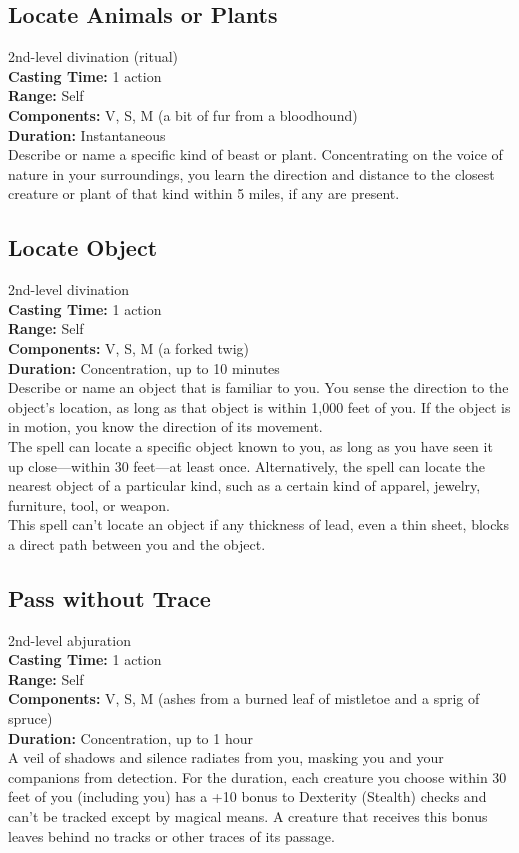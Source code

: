 \documentclass[11pt, A4paper, english]{article}
\begin{document}
		\subsection{Locate Animals or Plants}
2nd-level divination (ritual) \\
\textbf{Casting Time:} 1 action \\
\textbf{Range:} Self \\
\textbf{Components:} V, S, M (a bit of fur from a bloodhound) \\
\textbf{Duration:} Instantaneous \\
Describe or name a specific kind of beast or plant. Concentrating on the voice of nature in your surroundings, you learn the direction and distance to the closest creature or plant of that kind within 5 miles, if any are present.

		\subsection{Locate Object}
2nd-level divination \\
\textbf{Casting Time:} 1 action \\
\textbf{Range:} Self \\
\textbf{Components:} V, S, M (a forked twig) \\
\textbf{Duration:} Concentration, up to 10 minutes \\
Describe or name an object that is familiar to you. You sense the direction to the object’s location, as long as that object is within 1,000 feet of you. If the object is in motion, you know the direction of its movement. \\
The spell can locate a specific object known to you, as long as you have seen it up close—within 30 feet—at least once. Alternatively, the spell can locate the nearest object of a particular kind, such as a certain kind of apparel, jewelry, furniture, tool, or weapon. \\
This spell can’t locate an object if any thickness of lead, even a thin sheet, blocks a direct path between you and the object.

		\subsection{Pass without Trace}
2nd-level abjuration \\
\textbf{Casting Time:} 1 action \\
\textbf{Range:} Self \\
\textbf{Components:} V, S, M (ashes from a burned leaf of mistletoe and a sprig of spruce) \\
\textbf{Duration:} Concentration, up to 1 hour \\
A veil of shadows and silence radiates from you, masking you and your companions from detection. For the duration, each creature you choose within 30 feet of you (including you) has a +10 bonus to Dexterity (Stealth) checks and can’t be tracked except by magical means. A creature that receives this bonus leaves behind no tracks or other traces of its passage.
\end{document}
